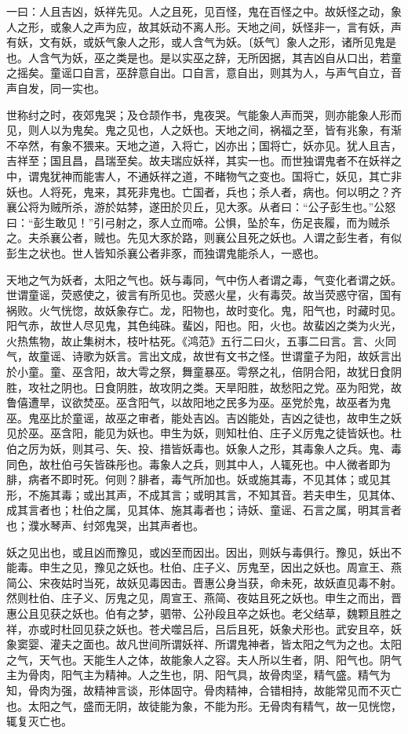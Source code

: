 \documentclass[]{article}
\begin{document}
一曰：人且吉凶，妖祥先见。人之且死，见百怪，鬼在百怪之中。故妖怪之动，象人之形，或象人之声为应，故其妖动不离人形。天地之间，妖怪非一，言有妖，声有妖，文有妖，或妖气象人之形，或人含气为妖。〔妖气〕象人之形，诸所见鬼是也。人含气为妖，巫之类是也。是以实巫之辞，无所因据，其吉凶自从口出，若童之摇矣。童谣口自言，巫辞意自出。口自言，意自出，则其为人，与声气自立，音声自发，同一实也。

世称纣之时，夜郊鬼哭；及仓颉作书，鬼夜哭。气能象人声而哭，则亦能象人形而见，则人以为鬼矣。鬼之见也，人之妖也。天地之间，祸福之至，皆有兆象，有渐不卒然，有象不猥来。天地之道，入将亡，凶亦出；国将亡，妖亦见。犹人且吉，吉祥至；国且昌，昌瑞至矣。故夫瑞应妖祥，其实一也。而世独谓鬼者不在妖祥之中，谓鬼犹神而能害人，不通妖祥之道，不睹物气之变也。国将亡，妖见，其亡非妖也。人将死，鬼来，其死非鬼也。亡国者，兵也；杀人者，病也。何以明之？齐襄公将为贼所杀，游於姑棼，遂田於贝丘，见大豕。从者曰：``公子彭生也。''公怒曰：``彭生敢见！''引弓射之，豕人立而啼。公惧，坠於车，伤足丧履，而为贼杀之。夫杀襄公者，贼也。先见大豕於路，则襄公且死之妖也。人谓之彭生者，有似彭生之状也。世人皆知杀襄公者非豕，而独谓鬼能杀人，一惑也。

天地之气为妖者，太阳之气也。妖与毒同，气中伤人者谓之毒，气变化者谓之妖。世谓童谣，荧惑使之，彼言有所见也。荧惑火星，火有毒荧。故当荧惑守宿，国有祸败。火气恍惚，故妖象存亡。龙，阳物也，故时变化。鬼，阳气也，时藏时见。阳气赤，故世人尽见鬼，其色纯硃。蜚凶，阳也。阳，火也。故蜚凶之类为火光，火热焦物，故止集树木，枝叶枯死。《鸿范》五行二曰火，五事二曰言。言、火同气，故童谣、诗歌为妖言。言出文成，故世有文书之怪。世谓童子为阳，故妖言出於小童。童、巫含阳，故大雩之祭，舞童暴巫。雩祭之礼，倍阴合阳，故犹日食阴胜，攻社之阴也。日食阴胜，故攻阴之类。天旱阳胜，故愁阳之党。巫为阳党，故鲁僖遭旱，议欲焚巫。巫含阳气，以故阳地之民多为巫。巫党於鬼，故巫者为鬼巫。鬼巫比於童谣，故巫之审者，能处吉凶。吉凶能处，吉凶之徒也，故申生之妖见於巫。巫含阳，能见为妖也。申生为妖，则知杜伯、庄子义厉鬼之徒皆妖也。杜伯之厉为妖，则其弓、矢、投、措皆妖毒也。妖象人之形，其毒象人之兵。鬼、毒同色，故杜伯弓矢皆硃彤也。毒象人之兵，则其中人，人辄死也。中人微者即为腓，病者不即时死。何则？腓者，毒气所加也。妖或施其毒，不见其体；或见其形，不施其毒；或出其声，不成其言；或明其言，不知其音。若夫申生，见其体、成其言者也；杜伯之属，见其体、施其毒者也；诗妖、童谣、石言之属，明其言者也；濮水琴声、纣郊鬼哭，出其声者也。

妖之见出也，或且凶而豫见，或凶至而因出。因出，则妖与毒俱行。豫见，妖出不能毒。申生之见，豫见之妖也。杜伯、庄子义、厉鬼至，因出之妖也。周宣王、燕简公、宋夜姑时当死，故妖见毒因击。晋惠公身当获，命未死，故妖直见毒不射。然则杜伯、庄子义、厉鬼之见，周宣王、燕简、夜姑且死之妖也。申生之而出，晋惠公且见获之妖也。伯有之梦，驷带、公孙段且卒之妖也。老父结草，魏颗且胜之祥，亦或时杜回见获之妖也。苍犬噬吕后，吕后且死，妖象犬形也。武安且卒，妖象窦婴、灌夫之面也。故凡世间所谓妖祥、所谓鬼神者，皆太阳之气为之也。太阳之气，天气也。天能生人之体，故能象人之容。夫人所以生者，阴、阳气也。阴气主为骨肉，阳气主为精神。人之生也，阴、阳气具，故骨肉坚，精气盛。精气为知，骨肉为强，故精神言谈，形体固守。骨肉精神，合错相持，故能常见而不灭亡也。太阳之气，盛而无阴，故徒能为象，不能为形。无骨肉有精气，故一见恍惚，辄复灭亡也。
\end{document}

